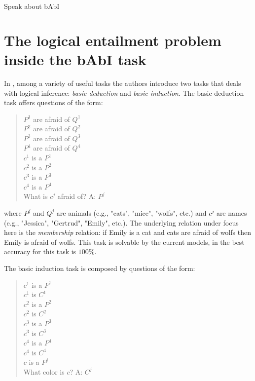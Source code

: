 Speak about bAbI


\section{The logical entailment problem inside the bAbI task}
\label{ch:03-tasks}


In \cite{WestonBCM15}, among a variety of useful tasks the authors introduce two tasks that deals with logical inference: \textit{basic deduction} and \textit{basic induction}. The basic deduction task offers questions of the form:

\begin{quote} 
\centering 
$P^{1}$ are afraid of $Q^{1}$\\
$P^{2}$ are afraid of $Q^{2}$\\
$P^{3}$ are afraid of $Q^{3}$\\
$P^{4}$ are afraid of $Q^{4}$\\
$c^{1}$ is a $P^{1}$\\
$c^{2}$ is a $P^{2}$\\
$c^{3}$ is a $P^{3}$\\
$c^{4}$ is a $P^{4}$\\
What is $c^j$ afraid of? A: $P^{j}$\\
\end{quote}

where $P^j$ and $Q^j$ are animals (e.g., "cats", "mice", "wolfs", etc.) and $c^j$ are names (e.g., "Jessica", "Gertrud", "Emily", etc.). The underlying relation under focus here is the \textit{membership} relation: if Emily is a cat and cats are afraid of wolfs then Emily is afraid of wolfs. This task is solvable by the current models, in \cite{WestonBCM15} the best accuracy for this task is $100\%$. 

The basic induction task is composed by questions of the form:

\begin{quote} 
\centering 
$c^{1}$ is a $P^{1}$\\
$c^{1}$ is $C^{1}$\\
$c^{2}$ is a $P^{2}$\\
$c^{2}$ is $C^{2}$\\
$c^{3}$ is a $P^{3}$\\
$c^{3}$ is $C^{3}$\\
$c^{4}$ is a $P^{4}$\\
$c^{4}$ is $C^{4}$\\
$c$ is a $P^{j}$\\
What color is $c$? A: $C^{j}$\\
\end{quote}

